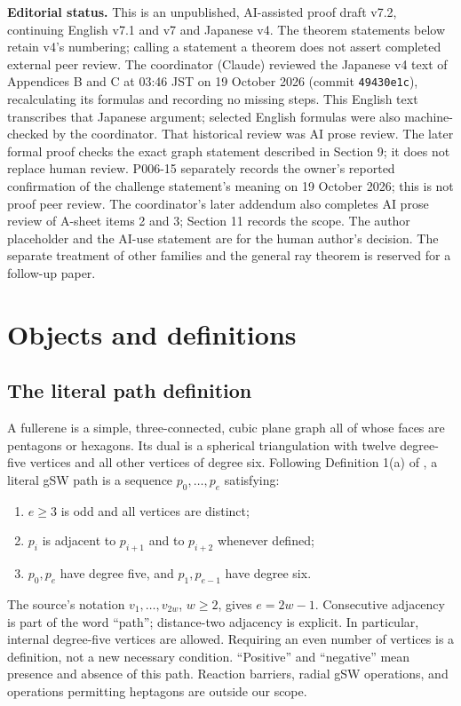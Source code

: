 \documentclass[11pt]{amsart}
\newcommand{\record}[1]{\nolinkurl{#1}}
\begin{document}
\noindent\textbf{Editorial status.} This is an unpublished, AI-assisted
proof draft v7.2, continuing English v7.1 and v7 and Japanese v4. The theorem statements below
retain v4's numbering; calling a statement a theorem does not assert
completed external peer review. The coordinator (Claude) reviewed the
Japanese v4 text of Appendices B and C at 03:46 JST on 19 October 2026
(commit \record{49430e1c}), recalculating its formulas and recording no
missing steps. This English text transcribes that Japanese argument;
selected English formulas were also machine-checked by the coordinator.
That historical review was AI prose review. The later formal proof
checks the exact graph statement described in Section 9; it does not
replace human review. P006-15 separately records the owner's
reported confirmation of the challenge statement's meaning on
19 October 2026; this is not proof peer review.
The coordinator's later addendum also completes AI prose review of A-sheet items 2 and 3; Section 11 records the scope. The author placeholder and the AI-use statement are
for the human author's decision. The separate treatment of other
families and the general ray theorem is reserved for a follow-up paper.

\section{Objects and definitions}\label{sec:definitions}
\subsection{The literal path definition}
A fullerene is a simple, three-connected, cubic plane graph all of whose
faces are pentagons or hexagons. Its dual is a spherical triangulation
with twelve degree-five vertices and all other vertices of degree six.
Following Definition 1(a) of \cite{BBS}, a literal gSW path is a sequence
$p_0,\ldots,p_e$ satisfying:
\begin{enumerate}
\item $e\ge3$ is odd and all vertices are distinct;
\item $p_i$ is adjacent to $p_{i+1}$ and to $p_{i+2}$ whenever defined;
\item $p_0,p_e$ have degree five, and $p_1,p_{e-1}$ have degree six.
\end{enumerate}
The source's notation $v_1,\ldots,v_{2w}$, $w\ge2$, gives $e=2w-1$.
Consecutive adjacency is part of the word ``path''; distance-two
adjacency is explicit. In particular, internal degree-five vertices
are allowed. Requiring an even number of vertices is a definition, not
a new necessary condition. ``Positive'' and ``negative'' mean presence
and absence of this path. Reaction barriers, radial gSW operations,
and operations permitting heptagons are outside our scope.
\end{document}
